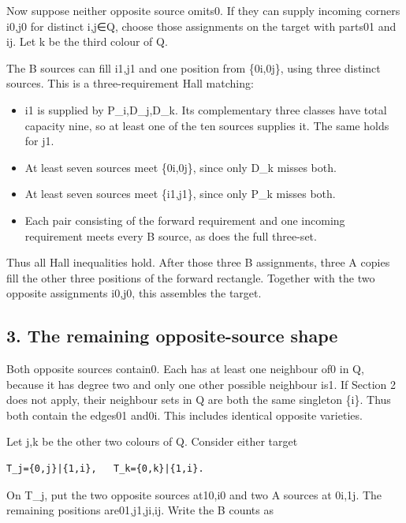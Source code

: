 \documentclass[
  10pt,
]{article}
\providecommand{\tightlist}{%
  \setlength{\itemsep}{0pt}\setlength{\parskip}{0pt}}
\begin{document}
Now suppose neither opposite source omits0. If they can supply incoming
corners i0,j0 for distinct i,j∈Q, choose those assignments on the target
with parts01 and ij. Let k be the third colour of Q.

The B sources can fill i1,j1 and one position from \{0i,0j\}, using
three distinct sources. This is a three-requirement Hall matching:

\begin{itemize}
\tightlist
\item
  i1 is supplied by P\_i,D\_j,D\_k. Its complementary three classes have
  total capacity nine, so at least one of the ten sources supplies it.
  The same holds for j1.
\item
  At least seven sources meet \{0i,0j\}, since only D\_k misses both.
\item
  At least seven sources meet \{i1,j1\}, since only P\_k misses both.
\item
  Each pair consisting of the forward requirement and one incoming
  requirement meets every B source, as does the full three-set.
\end{itemize}

Thus all Hall inequalities hold. After those three B assignments, three
A copies fill the other three positions of the forward rectangle.
Together with the two opposite assignments i0,j0, this assembles the
target.

\hypertarget{the-remaining-opposite-source-shape}{%
\subsection*{3. The remaining opposite-source
shape}\label{the-remaining-opposite-source-shape}}

Both opposite sources contain0. Each has at least one neighbour of0 in
Q, because it has degree two and only one other possible neighbour is1.
If Section 2 does not apply, their neighbour sets in Q are both the same
singleton \{i\}. Thus both contain the edges01 and0i. This includes
identical opposite varieties.

Let j,k be the other two colours of Q. Consider either target

\begin{verbatim}
T_j={0,j}|{1,i},   T_k={0,k}|{1,i}.
\end{verbatim}

On T\_j, put the two opposite sources at10,i0 and two A sources at
0i,1j. The remaining positions are01,j1,ji,ij. Write the B counts as
\end{document}

